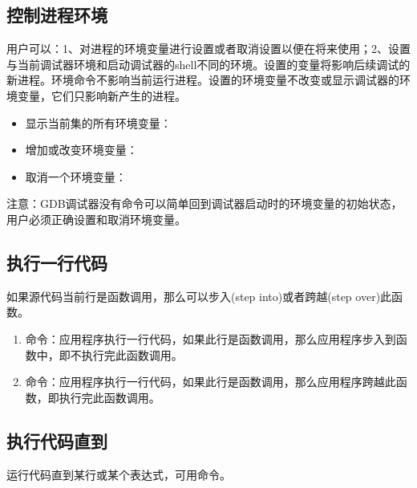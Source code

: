 \documentclass[a4paper,12pt,english]{sphinxmanual}
\begin{document}
\subsection{控制进程环境}
\label{\detokenize{debug/debug:id16}}
\sphinxAtStartPar
用户可以：1、对进程的环境变量进行设置或者取消设置以便在将来使用；2、设置与当前调试器环境和启动调试器的shell不同的环境。设置的变量将影响后续调试的新进程。环境命令不影响当前运行进程。设置的环境变量不改变或显示调试器的环境变量，它们只影响新产生的进程。
\begin{itemize}
\item {} 
\sphinxAtStartPar
显示当前集的所有环境变量：

\item {} 
\sphinxAtStartPar
增加或改变环境变量：

\item {} 
\sphinxAtStartPar
取消一个环境变量：

\end{itemize}

\sphinxAtStartPar
注意：GDB调试器没有命令可以简单回到调试器启动时的环境变量的初始状态，用户必须正确设置和取消环境变量。


\subsection{执行一行代码}
\label{\detokenize{debug/debug:id17}}
\sphinxAtStartPar
如果源代码当前行是函数调用，那么可以步入(step into)或者跨越(step over)此函数。
\begin{enumerate}
%
\item {} 
\sphinxAtStartPar
{}命令：应用程序执行一行代码，如果此行是函数调用，那么应用程序步入到函数中，即不执行完此函数调用。

\item {} 
\sphinxAtStartPar
{}命令：应用程序执行一行代码，如果此行是函数调用，那么应用程序跨越此函数，即执行完此函数调用。

\end{enumerate}


\subsection{执行代码直到}
\label{\detokenize{debug/debug:id18}}
\sphinxAtStartPar
运行代码直到某行或某个表达式，可用命令。
\end{document}
